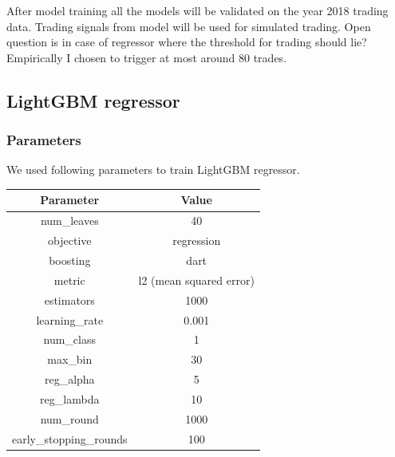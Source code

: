 \documentclass[final,2p]{elsarticle}
\begin{document}
After model training all the models will be validated on the year 2018 trading data. Trading signals from model will be used for simulated trading. Open question is in case of regressor where the threshold for trading should lie?
Empirically I chosen to trigger at most around $80$ trades.

\subsection{LightGBM regressor}

\subsubsection{Parameters}
We used following parameters to train LightGBM regressor. 

\begin{center}
\begin{tabular}{cc}
    Parameter & Value \\
    \hline
    num\_leaves & 40 \\
    objective & regression \\
    boosting & dart \\
    metric & l2 (mean squared error) \\
    estimators & 1000 \\
    learning\_rate & 0.001 \\
    num\_class & 1 \\
    max\_bin & 30 \\
    reg\_alpha & 5 \\
    reg\_lambda & 10 \\
    num\_round & 1000 \\
    early\_stopping\_rounds & 100 \\
\end{tabular}
\end{center}
\end{document}
